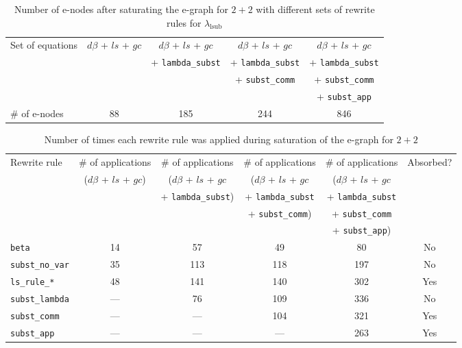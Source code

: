 \begin{table}
	\begin{tabular}{lcccc}
		Set of equations & $d\beta$ + $ls$ + $gc$ & $d\beta$ + $ls$ + $gc$    & $d\beta$ + $ls$ + $gc$     & $d\beta$ + $ls$ + $gc$\\
		                 &                        & + \texttt{lambda\_subst}  & + \texttt{lambda\_subst}   & + \texttt{lambda\_subst}\\
		                 &                        &                           & + \texttt{subst\_comm}     & + \texttt{subst\_comm}\\
						 &                        &                           &                            & + \texttt{subst\_app}\\						 
		\# of e-nodes    & 88                     & 185                       & 244                        & 846
	\end{tabular}
	\caption{Number of e-nodes after saturating the e-graph for $2 + 2$ with different sets of rewrite rules for $\lambda_{\text{lsub}}$}
	\label{tbl:slotted}
\end{table}

\begin{table}
	\begin{tabular}{l|ccccc}
		Rewrite rule & \# of applications     & \# of applications         & \# of applications      & \# of applications       & Absorbed?\\
		             &($d\beta$ + $ls$ + $gc$)&($d\beta$ + $ls$ + $gc$     &($d\beta$ + $ls$ + $gc$  &($d\beta$ + $ls$ + $gc$   &\\
		             &                        & + \texttt{lambda\_subst})  & + \texttt{lambda\_subst}& + \texttt{lambda\_subst} &\\
		             &                        &                            & + \texttt{subst\_comm}) & + \texttt{subst\_comm}   &\\
		             &                        &                            &                         & + \texttt{subst\_app})   &\\
		\hline
		\texttt{beta} & 14 & 57 & 49 & 80 & No\\
		\texttt{subst\_no\_var} & 35 & 113 & 118 & 197 & No\\
		\rowcolor{gray!30}
		\texttt{ls\_rule\_*} & 48 & 141 & 140 & 302 & Yes\\
		\texttt{subst\_lambda} & --- & 76 & 109 & 336 & No\\
		\rowcolor{gray!30}
		\texttt{subst\_comm} & --- & --- & 104 & 321 & Yes\\
		\rowcolor{gray!30}
		\texttt{subst\_app} & --- & --- & --- & 263 & Yes\\
	\end{tabular}
	\caption{Number of times each rewrite rule was applied during saturation of the e-graph for $2 + 2$}
	\label{tbl:slotted-rewrite-applications}
\end{table}

